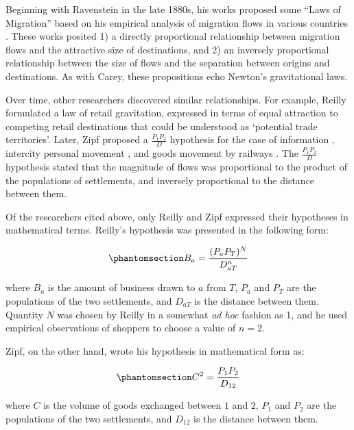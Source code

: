 \documentclass[
  10pt,
  letterpaper,
]{article}
\begin{document}
Beginning with Ravenstein in the late 1880s, his works proposed some
``Laws of Migration'' based on his empirical analysis of migration flows
in various countries
\citep{ravensteinLawsMigration1885, ravensteinLawsMigration1889}. These
works posited 1) a directly proportional relationship between migration
flows and the attractive size of destinations, and 2) an inversely
proportional relationship between the size of flows and the separation
between origins and destinations. As with Carey, these propositions echo
Newton's gravitational laws.

Over time, other researchers discovered similar relationships. For
example, Reilly \citep{reilly1929methods} formulated a law of retail
gravitation, expressed in terms of equal attraction to competing retail
destinations that could be understood as `potential trade territories'.
Later, Zipf proposed a \(\frac{P_1P_2}{D}\) hypothesis for the case of
information \citep{zipfDeterminantsCirculationInformation1946},
intercity personal movement \citep{zipfHypothesisIntercityMovement1946},
and goods movement by railways \citep{zipfHypothesisCaseRailway1946}.
The \(\frac{P_1P_2}{D}\) hypothesis stated that the magnitude of flows
was proportional to the product of the populations of settlements, and
inversely proportional to the distance between them.

Of the researchers cited above, only Reilly and Zipf expressed their
hypotheses in mathematical terms. Reilly's hypothesis was presented in
the following form:

\begin{equation}\phantomsection\label{eq-reilly}{
B_a = \frac{(P_a P_T)^N}{D_{aT}^n}
}\end{equation}

\noindent where \(B_a\) is the amount of business drawn to \(a\) from
\(T\), \(P_a\) and \(P_T\) are the populations of the two settlements,
and \(D_{aT}\) is the distance between them. Quantity \(N\) was chosen
by Reilly in a somewhat \emph{ad hoc} fashion as 1, and he used
empirical observations of shoppers to choose a value of \(n = 2\).

Zipf, on the other hand, wrote his hypothesis in mathematical form as:

\begin{equation}\phantomsection\label{eq-zipf}{
C^2 = \frac{P_1 P_2}{D_{12}}
}\end{equation}

\noindent where \(C\) is the volume of goods exchanged between \(1\) and
\(2\), \(P_1\) and \(P_2\) are the populations of the two settlements,
and \(D_{12}\) is the distance between them.
\end{document}
